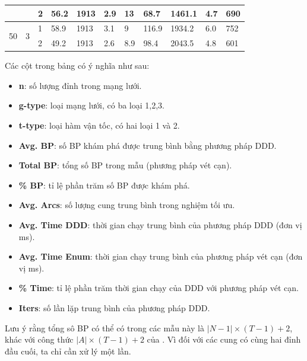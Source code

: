 \documentclass[../main.tex]{subfiles}
\begin{document}
\begin{table}[h]
{\begin{tabular}{|p{0.5cm}|p{1cm}|p{1cm}||p{1.5cm}|p{1.5cm}|p{1.3cm}||p{1.5cm}|p{2.5cm}|p{2.5cm}|p{1.3cm}|p{1.3cm}|}
                    &                    & 2     & 56.2            & 1913     & 2.9             & 13                & 68.7                  & 1461.1                 & 4.7          & 690        \\ \midrule
\multirow{2}{*}{50} & \multirow{2}{*}{3} & 1     & 58.9            & 1913     & 3.1             & 9                 & 116.9                 & 1934.2                 & 6.0          & 752        \\
                    &                    & 2     & 49.2            & 1913     & 2.6             & 8.9               & 98.4                  & 2043.5                 & 4.8          & 601         \\ \bottomrule
  \end{tabular}
  }
\end{table}

Các cột trong bảng có ý nghĩa như sau: 
\begin{itemize}
  \item \textbf{n}: số lượng đỉnh trong mạng lưới.
  \item \textbf{g-type}: loại mạng lưới, có ba loại 1,2,3.
  \item \textbf{t-type}: loại hàm vận tốc, có hai loại 1 và 2.
  \item \textbf{Avg. BP}: số BP khám phá được trung bình bằng phương pháp DDD.
  \item \textbf{Total BP}: tổng số BP trong mẫu (phương pháp vét cạn).
  \item \textbf{\% BP}: tỉ lệ phần trăm số BP được khám phá.
  \item \textbf{Avg. Arcs}: số lượng cung trung bình trong nghiệm tối ưu.
  \item \textbf{Avg. Time DDD}: thời gian chạy trung bình của phương pháp DDD (đơn vị ms).
  \item \textbf{Avg. Time Enum}: thời gian chạy trung bình của phương pháp vét cạn (đơn vị ms).
  \item \textbf{\% Time}: tỉ lệ phần trăm thời gian chạy của DDD với phương pháp vét cạn.
  \item \textbf{Iters}: số lần lặp trung bình của phương pháp DDD.
\end{itemize}
Lưu ý rằng tổng sô BP có thể có trong các mẫu này là
\(|N − 1| \times (T − 1) + 2\), khác với công thức
\(|A| \times (T − 1) + 2\) của \cite{foschini2011complexity}. Vì đối
với các cung có cùng hai đỉnh đầu cuối, ta chỉ cần xử lý một lần.
\end{document}

